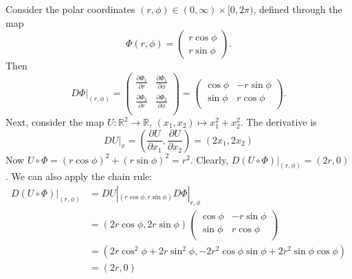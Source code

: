 \documentclass[10pt]{article}
\newcommand{\R}{\mathbb{R}}
\begin{document}
  \begin{example}
    Consider the polar coordinates $(r, \phi) \in (0,\infty) \times [0, 2\pi)$, defined through the map
    \[
      \Phi(r, \phi) = \begin{pmatrix} r \cos\phi \\ r \sin\phi \end{pmatrix}. 
    \]
    Then 
    \[
      D\Phi|_{(r, \phi)} = \begin{pmatrix}
        \frac{\partial \Phi_{1}}{\partial r} & \frac{\partial \Phi_{1}}{\partial \phi} \\
        \frac{\partial \Phi_{2}}{\partial r} & \frac{\partial \Phi_{2}}{\partial \phi} \\
      \end{pmatrix}
      = \begin{pmatrix}
        \cos \phi & -r \sin \phi \\
        \sin \phi & r \cos \phi \\
      \end{pmatrix}.
    \]
    Next, consider the map $U : \R^{2} \to \R$, $(x_{1}, x_{2}) \mapsto x_{1}^{2}+x_{2}^{2}$. The derivative is
    \[
      DU|_{x} = \left(\frac{\partial U}{\partial x_{1}}, \frac{\partial U}{\partial x_{2}}\right) 
      = (2x_{1}, 2x_{2}) 
    \]
    Now $U \circ \Phi = (r\cos\phi)^{2} + (r\sin\phi)^{2} = r^{2}$. Clearly, $D(U \circ \Phi)|_{(r, \phi)} = (2r, 0)$.
    We can also apply the chain rule:
    \[
      \begin{aligned}
        D(U \circ \Phi)|_{(r, \phi)} &= DU|_{(r \cos \phi, r \sin \phi)}D\Phi|_{r, \phi} \\
        &= (2r \cos \phi, 2r \sin \phi) \begin{pmatrix}
          \cos \phi & -r \sin \phi \\
          \sin \phi & r \cos \phi \\
        \end{pmatrix} \\
        &= (2r \cos^{2} \phi + 2r \sin^{2} \phi, -2r^{2} \cos \phi \sin \phi + 2r^{2} \sin \phi \cos \phi) \\
        &= (2r, 0)\\
      \end{aligned}
    \]
  \end{example}
\end{document}
